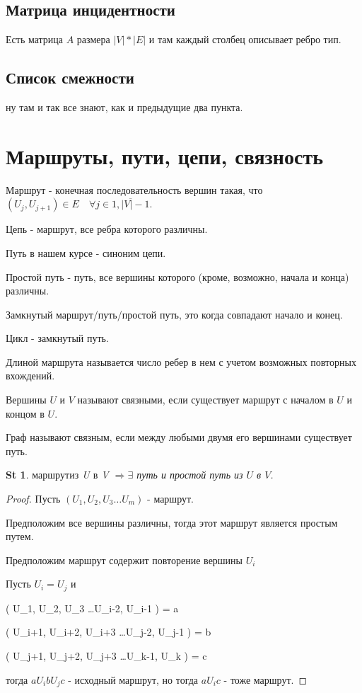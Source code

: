 \documentclass[a6paper, 10pt]{article}
\theoremstyle{plain}
\newtheorem*{statement}{St}
\newcommand{\rarrow}{\Rightarrow}
\begin{document}
	\subsection{Матрица инцидентности}

	Есть матрица $ A $ размера $ \left| V \right| * \left| E \right| $
	и там каждый столбец описывает ребро тип.

	\subsection{Список смежности}

	ну там и так все знают, как и предыдущие два пункта.

	\section{Маршруты, пути, цепи, связность}

	Маршрут - конечная последовательность вершин такая, что
	$ (U_j, U_{j+1}) \in E \quad \forall j \in \overline{1, \left|V\right|-1} $.

	Цепь - маршрут, все ребра которого различны.

	Путь в нашем курсе - синоним цепи.

	Простой путь - путь, все вершины которого (кроме, возможно, начала и конца) различны.

	Замкнутый маршрут/путь/простой путь, это когда совпадают начало и конец.

	Цикл - замкнутый путь.

	Длиной маршрута называется число ребер в нем с учетом возможных повторных вхождений.

	Вершины $ U $ и $ V $ называют связными, если существует маршрут
	с началом в $ U $ и концом в $ U $.

	Граф называют связным, если между любыми двумя его вершинами существует путь.

	\begin{statement}
	\exists $ маршрут из $ U $ в $ V $ \rarrow  \exists $ путь и простой путь из $ U $ в $ V $.
	\end{statement}

	\begin{proof}
		Пусть $ \left( U_1, U_2, U_3 \dots U_m \right) $ - маршрут.

		Предположим все вершины различны, тогда этот маршрут является простым путем.

		Предположим маршрут содержит повторение вершины $ U_i $


		Пусть $ U_i = U_j $ и

	\begin{allign}
		\left( U_1, U_2, U_3 \dots U_{i-2}, U_{i-1} \right) = a

		\left( U_{i+1}, U_{i+2}, U_{i+3} \dots U_{j-2}, U_{j-1} \right) = b

		\left( U_{j+1}, U_{j+2}, U_{j+3} \dots U_{k-1}, U_{k} \right) = c
	\end{allign}

	тогда $ a U_i b U_j c $ - исходный маршрут, но тогда $ a U_i c $ - тоже маршрут.

	\end{proof}
\end{document}
